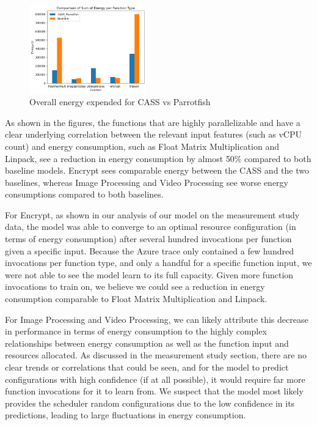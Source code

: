 \documentclass[times, 10pt,twocolumn]{article}
\begin{document}
 \begin{figure}[ht]
   \centering
   \includegraphics[width=0.45\textwidth]{imgs/final_experiment_plots/energy_comparison/parrotfish/overall.png}
   \caption{Overall energy expended for CASS vs Parrotfish}
   \label{fig:CASSvsParrotfish}
 \end{figure}

As shown in the figures, the functions that are highly parallelizable and have a clear underlying correlation between the relevant input features (such as vCPU count) and energy consumption, such as Float Matrix Multiplication and Linpack, see a reduction in energy consumption by almost 50\% compared to both baseline models. Encrypt sees comparable energy between the CASS and the two baselines, whereas Image Processing and Video Processing see worse energy consumptions compared to both baselines.

For Encrypt, as shown in our analysis of our model on the measurement study data, the model was able to converge to an optimal resource configuration (in terms of energy consumption) after several hundred invocations per function given a specific input. Because the Azure trace only contained a few hundred invocations per function type, and only a handful for a specific function input, we were not able to see the model learn to its full capacity. Given more function invocations to train on, we believe we could see a reduction in energy consumption comparable to Float Matrix Multiplication and Linpack.

For Image Processing and Video Processing, we can likely attribute this decrease in performance in terms of energy consumption to the highly complex relationships between energy consumption as well as the function input and resources allocated. As discussed in the measurement study section, there are no clear trends or correlations that could be seen, and for the model to predict configurations with high confidence (if at all possible), it would require far more function invocations for it to learn from. We suspect that the model most likely provides the scheduler random configurations due to the low confidence in its predictions, leading to large fluctuations in energy consumption. 
\end{document}
